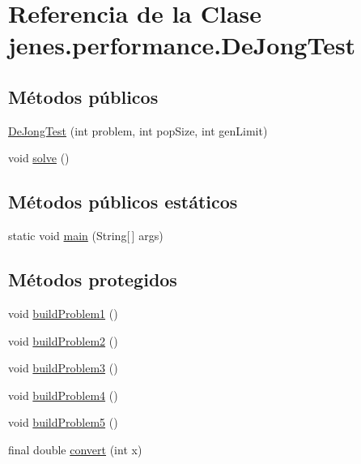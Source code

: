 \hypertarget{classjenes_1_1performance_1_1_de_jong_test}{\section{Referencia de la Clase jenes.\-performance.\-De\-Jong\-Test}
\label{classjenes_1_1performance_1_1_de_jong_test}
}
\subsection*{Métodos públicos}
\begin{DoxyCompactItemize}
\item 
\hyperlink{classjenes_1_1performance_1_1_de_jong_test_a795332b956040573e1567a687b734c0f}{De\-Jong\-Test} (int problem, int pop\-Size, int gen\-Limit)
\item 
void \hyperlink{classjenes_1_1performance_1_1_de_jong_test_aac1afb2071483b28a6c55b62bfe32e31}{solve} ()
\end{DoxyCompactItemize}
\subsection*{Métodos públicos estáticos}
\begin{DoxyCompactItemize}
\item 
static void \hyperlink{classjenes_1_1performance_1_1_de_jong_test_ab226b971a6f791d5a49dd4c2718f81d7}{main} (String\mbox{[}$\,$\mbox{]} args)
\end{DoxyCompactItemize}
\subsection*{Métodos protegidos}
\begin{DoxyCompactItemize}
\item 
void \hyperlink{classjenes_1_1performance_1_1_de_jong_test_acd3c1b93304e2d46f53891a2bf82bf8b}{build\-Problem1} ()
\item 
void \hyperlink{classjenes_1_1performance_1_1_de_jong_test_ad444e70d87a8a65d868a08f836ddca44}{build\-Problem2} ()
\item 
void \hyperlink{classjenes_1_1performance_1_1_de_jong_test_a04ba560b3c32b954db4b0e2de7e0fea3}{build\-Problem3} ()
\item 
void \hyperlink{classjenes_1_1performance_1_1_de_jong_test_a1dd8d7b4740a0f65699bac3b7c64cebf}{build\-Problem4} ()
\item 
void \hyperlink{classjenes_1_1performance_1_1_de_jong_test_ad1282e40a9a1711898f700f17f90bcb0}{build\-Problem5} ()
\item 
final double \hyperlink{classjenes_1_1performance_1_1_de_jong_test_afd03d3c06d2c0a3ff64a384413e1c1fd}{convert} (int x)
\end{DoxyCompactItemize}
